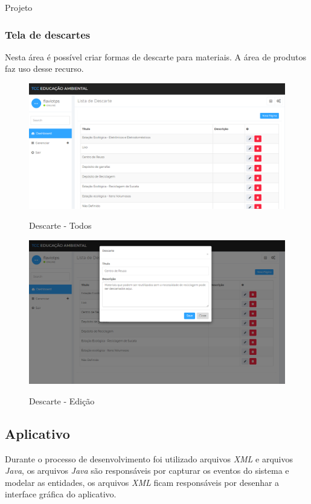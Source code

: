 \documentclass[
	12pt,				%
	openright,			%
	twoside,			%
	a4paper,			%
	english,			%
	french,				%
	spanish,			%
	brazil				%
	]{abntex2}
\begin{document}
\begin{chapter}{Projeto}
\subsubsection{Tela de descartes}
Nesta área é possível criar formas de descarte para materiais. A área de produtos faz uso desse recurso.

\begin{figure}[h]
\centering
   \caption{Descarte - Todos}
   \includegraphics[scale=0.40]{media/tela_descarte_site_1.png}
     \label{fig:tela_descarte_site_1}
\end{figure}

\begin{figure}[h]
\centering
   \caption{Descarte - Edição}
   \includegraphics[scale=0.40]{media/tela_descarte_site_2.png}
     \label{fig:tela_descarte_site_2}
\end{figure}
\newpage
\subsection{Aplicativo}
Durante o processo de desenvolvimento foi utilizado arquivos \textit{XML} e arquivos \textit{Java}, os arquivos \textit{Java} são responsáveis por capturar os eventos do sistema e modelar as entidades, os arquivos \textit{XML} ficam responsáveis por desenhar a interface gráfica do aplicativo.


\end{chapter}
\end{document}
